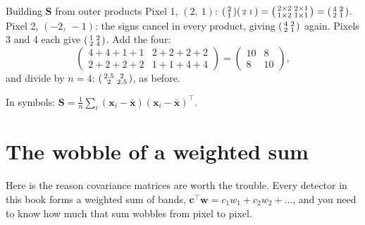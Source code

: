 \documentclass[11pt,a4paper,oneside,openany]{book}
\newcommand{\B}[1]{{\symbf{#1}}}
\newcommand{\B}[1]{{\bm{#1}}}
\newcommand{\T}{^{\top}}
\newcommand{\vx}{\B{x}}
\newcommand{\vw}{\B{w}}
\newcommand{\vc}{\B{c}}
\newcommand{\mS}{\B{S}}
\begin{document}
\begin{worked}[label=we:outer]{Building $\mS$ from outer products}
Pixel 1, $(2,\ 1)$: $\begin{psmallmatrix}2\\1\end{psmallmatrix}\begin{psmallmatrix}2&1\end{psmallmatrix}
=\begin{psmallmatrix}2\times2&2\times1\\1\times2&1\times1\end{psmallmatrix}=\begin{psmallmatrix}4&2\\2&1\end{psmallmatrix}$.
Pixel 2, $(-2,\ -1)$: the signs cancel in every product, giving $\begin{psmallmatrix}4&2\\2&1\end{psmallmatrix}$ again.
Pixels 3 and 4 each give $\begin{psmallmatrix}1&2\\2&4\end{psmallmatrix}$. Add the four:
\[
  \begin{pmatrix}4+4+1+1&2+2+2+2\\2+2+2+2&1+1+4+4\end{pmatrix}=\begin{pmatrix}10&8\\8&10\end{pmatrix},
\]
and divide by $n=4$: $\begin{psmallmatrix}2.5&2\\2&2.5\end{psmallmatrix}$, as before.
\end{worked}

In symbols: $\mS=\frac1n\sum_i(\vx_i-\bar{\vx})(\vx_i-\bar{\vx})\T$.

\section{The wobble of a weighted sum}

Here is the reason covariance matrices are worth the trouble. Every detector in this book forms a weighted sum of bands,
$\vc\T\vw=c_1w_1+c_2w_2+\dots$, and you need to know how much that sum wobbles from pixel to pixel.
\end{document}
